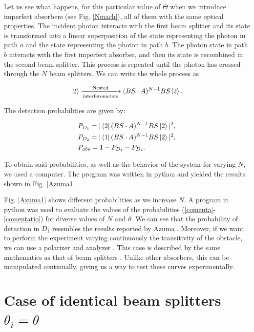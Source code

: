 \documentclass[12pt]{book}
\begin{document}
  Let us see what happens, for this particular value of $\Theta$ when we introduce imperfect absorbers (see Fig. \ref{Nmach}), all of them with the same optical properties. The incident photon interacts with the first beam splitter and its state is transformed into a linear superposition of the state representing the photon in path $a$ and the state representing the photon in path $b$. The photon state in path $b$  interacts with the first imperfect absorber, and then its state is recombined in the second beam splitter. This process is repeated until the photon has crossed through the $N$ beam splitters. We can write the whole process as 


\begin{equation}\ket{2}\xrightarrow[\text{interferometers}]{\text{Nested}}(BS \cdot A)^{N-1}BS \ket{2}.
\end{equation}

The detection probabilities are given by:

\begin{align}
&P_{D_{1}}=|\bra{2} (BS \cdot A)^{N-1}BS \ket{2}|^2,\label{comenta}\\
&P_{D_{2}}=|\bra{1} (BS \cdot A)^{N-1}BS \ket{2}|^2,\\
&P_{abs}=1-P_{D_{1}}-P_{D_{2}}.
\label{comentatio}
\end{align}
 
 
To obtain said probabilities, as well as the behavior of the system for varying $N$, we used a computer. The program was written in python and yielded the results shown in Fig. \ref{Azuma1}




Fig. \ref{Azuma1} shows  different probabilities as we increase $N$. A program in python was used to evaluate the values of the probabilities (\ref{comenta}-\ref{comentatio}) for diverse values of $N$ and $\theta$. We can see that the probability of detection in $D_{1}$ resembles the results reported by Azuma \cite{Azuma}. Moreover, if we want to perform the experiment varying continuously the transitivity of the obstacle, we can use a polarizer and analyzer \cite{nosirve}.  This case is described by the same mathematics as that of beam splitters \cite{nosirve}. Unlike other absorbers, this can be manipulated continually, giving us a way to test these curves experimentally. 



 \section{Case of identical beam splitters $\theta_{i}=\theta$}
 
\end{document}
